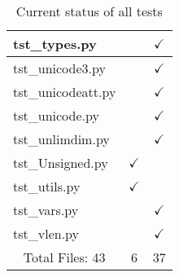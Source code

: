 \begin{table}[H]
\begin{tabular}{|l|c|c|}
tst\_types.py                           &                              &      $\checkmark$         \\ \hline
tst\_unicode3.py                        &                              &      $\checkmark$         \\ \hline
tst\_unicodeatt.py                      &                              &      $\checkmark$         \\ \hline
tst\_unicode.py                         &                              &      $\checkmark$         \\ \hline
tst\_unlimdim.py                        &                              &      $\checkmark$         \\ \hline
tst\_Unsigned.py                        &          $\checkmark$        &                           \\ \hline
tst\_utils.py                           &          $\checkmark$        &                           \\ \hline
tst\_vars.py                            &                              &      $\checkmark$         \\ \hline
tst\_vlen.py                            &                              &      $\checkmark$         \\ \hline
\multicolumn{1}{|c|}{Total Files: 43}   & \multicolumn{1}{c|}{6}       & \multicolumn{1}{c|}{37}   \\ \hline
\hline
\end{tabular}
\caption{\label{tab:python} Current status of all tests}
\end{table}

